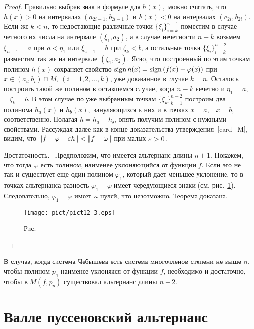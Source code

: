 \begin{proof}
Правильно выбрав знак в формуле для $h(x),$ можно считать, что $h(x)>0$ на интервалах
{$(a_{2i-1},b_{2i-1})$} и $h(x)<0$ на интервалах $(a_{2i},b_{2i})$.
{Если же $k<n$, то
недостающие различные точки $\{\xi_i\}_{i=k}^{n-1}$ поместим в случае
четного их числа на интервале $(\xi_1,a_2)$, а в случае нечетности $n-k$
возьмем $\xi_{n-1}=a$ при $a<\eta_1$ или $\xi_{n-1}=b$ при $\zeta_k<b$,
а остальные точки $\{\xi_i\}_{i=k}^{n-2}$ разместим так же на интервале
$(\xi_1,a_2).$ Ясно, что построенный по этим точкам полином $h(x)$
сохраняет свойство ${\rm sign \, } h(x)={\rm sign \, }(f(x)-\varphi(x))$ при $x\in(a_i,b_i)\cap M,\
(i=1,2,\ldots,k)$, уже доказанное в случае $k=n.$
Осталось построить такой же полином в оставшемся
случае, когда $n-k$ нечетно и $\eta_1=a,$~ $\zeta_k=b.$ В этом случае по уже
выбранным точкам $\{\xi_k\}_{k=1}^{n-2}$ построим два полинома
$h_a(x)$ и $h_b(x),$ зануляющихся в них и в точках $x=a,$~ $x=b,$ соответственно.
Полагая $h=h_a+h_b$, опять получим полином с нужными свойствами.}
Рассуждая далее как в конце доказательства утверждения~\ref{card_M}, видим, что
$\|f-\varphi-\varepsilon h\|<\|f-\varphi\|$ при малых $\varepsilon>0$.

Д\;о\;с\;т\;а\;т\;о\;ч\;н\;о\;с\;т\;ь.~ Предположим, что имеется альтернанс длины
$n+1$. Покажем, что тогда $\varphi$ есть полином, наименее
уклоняющийся от функции $f$. Если это не так и существует еще один полином
$\varphi_1$, который дает меньшее уклонение, то в точках альтернанса
{разность $\varphi_1-\varphi$ имеет чередующиеся знаки (см. рис.~\ref{r12-3}). Следовательно,}
$\varphi_1-\varphi$ имеет $n$ нулей, что
невозможно. Теорема доказана.

 \bigskip
\begin{figure}[ht]
\begin{center}
\texttt{[image: pict/pict12-3.eps]}
\end{center}
 \bigskip
 \label{r12-3}

 \centerline{Рис.~\theris}
 \bigskip
\end{figure}


\end{proof}

\begin{Remark}
В случае, когда система Чебышева есть система многочленов степени не
выше $n$, {чтобы полином $p_n$ наименее уклонялся от функции $f$,}
необходимо и достаточно, чтобы {в $M(f,p_n)$} существовал альтернанс
длины $n+2$.
\end{Remark}


\section{Валле пуссеновский альтернанс}


